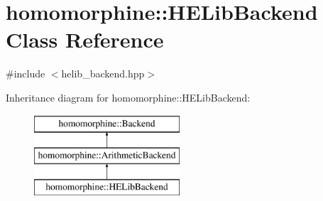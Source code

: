 \hypertarget{classhomomorphine_1_1_h_e_lib_backend}{}\section{homomorphine\+:\+:H\+E\+Lib\+Backend Class Reference}
\label{classhomomorphine_1_1_h_e_lib_backend}


{\ttfamily \#include $<$helib\+\_\+backend.\+hpp$>$}

Inheritance diagram for homomorphine\+:\+:H\+E\+Lib\+Backend\+:\begin{figure}[H]
\begin{center}
\leavevmode
\includegraphics[height=3.000000cm]{classhomomorphine_1_1_h_e_lib_backend}
\end{center}
\end{figure}
